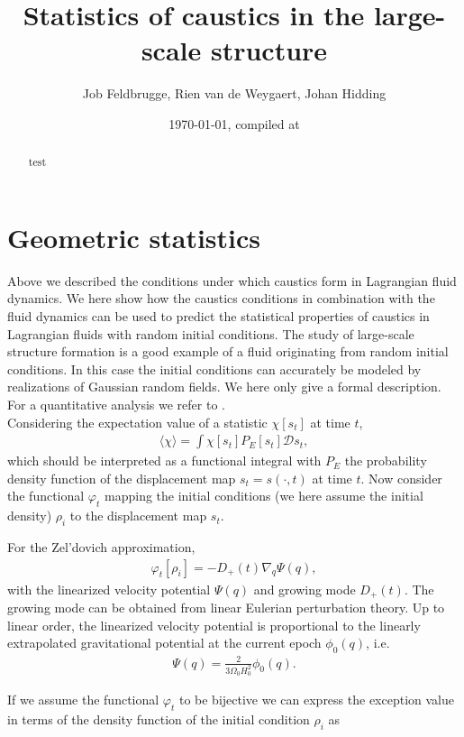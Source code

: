 \documentclass[11pt]{article}
\title{Statistics of caustics in the large-scale structure}
\author{Job Feldbrugge, Rien van de Weygaert, Johan Hidding}
\date{\today, compiled at \currenttime}
\begin{document}
\maketitle
\begin{abstract}
\noindent test
\end{abstract}
 

\section{Geometric statistics}
\label{sec:statistics}
Above we described the conditions under which caustics form in Lagrangian fluid dynamics. We here show how the caustics conditions in combination with the fluid dynamics can be used to predict the statistical properties of caustics in Lagrangian fluids with random initial conditions. The study of large-scale structure formation is a good example of a fluid originating from random initial conditions. In this case the initial conditions can accurately be modeled by realizations of Gaussian random fields. We here only give a formal description. For a quantitative analysis we refer to \cite{}.\\
\indent Considering the expectation value of a statistic $\chi[s_t]$ at time $t$,
\begin{align*}
\langle \chi \rangle = \int \chi[s_t] P_E[s_t] \mathcal{D}s_t,
\end{align*}
which should be interpreted as a functional integral with $P_E$ the probability density function of the displacement map $s_t=s(\cdot,t)$ at time $t$. Now consider the functional $\varphi_t$ mapping the initial conditions (we here assume the initial density) $\rho_i$ to the displacement map $s_t$.
\begin{framed}
\indent For the Zel'dovich approximation,
\begin{align*}
\varphi_t[\rho_i]=-D_+(t) \nabla_q \Psi(q),
\end{align*}
with the linearized velocity potential $\Psi(q)$ and growing mode $D_+(t)$. The growing mode can be obtained from linear Eulerian perturbation theory. Up to linear order, the linearized velocity potential is proportional to the linearly extrapolated gravitational potential at the current epoch $\phi_0(q)$, i.e.
\begin{align}
\Psi(q)=\frac{2}{3\Omega_0 H_0^2}\phi_0(q).
\end{align}  
\end{framed}
\noindent If we assume the functional $\varphi_t$ to be bijective we can express the exception value in terms of the density function of the initial condition $\rho_i$ as
\end{document}

